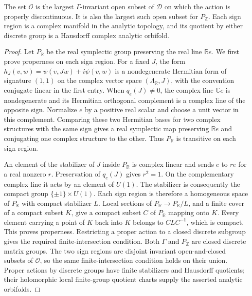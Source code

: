 \begin{theorem}\label{fam:src:F.2.2}\label{fam:st:F.2.2}
The set $\mathcal O$ is the largest $\Gamma$-invariant open subset of
$\mathcal D$ on which the action is properly discontinuous.  It is also
the largest such open subset for $P_{\mathbb Z}$.  Each sign region is
a complex manifold in the analytic topology, and its quotient by either
discrete group is a Hausdorff complex analytic orbifold.
\end{theorem}

\begin{proof}
Let $P_{\mathbb R}$ be the real symplectic group preserving the real line
$\mathbb Re$.  We first prove properness on each sign region.  For a fixed
$J$, the form
$h_J(v,w)=\psi(v,Jw)+i\psi(v,w)$ is a nondegenerate Hermitian form of
signature $(1,1)$ on the complex vector space $(\Lambda_{\mathbb R},J)$,
with the convention conjugate linear in the first entry.  When
$q_e(J)\ne0$, the complex line $\mathbb Ce$ is nondegenerate and its
Hermitian orthogonal complement is a complex line of the opposite sign.
Normalize $e$ by a positive real scalar and choose a unit vector in this
complement.  Comparing these two Hermitian bases for two complex
structures with the same sign gives a real symplectic map preserving
$\mathbb Re$ and conjugating one complex structure to the other.  Thus
$P_{\mathbb R}$ is transitive on each sign region.

An element of the stabilizer of $J$ inside $P_{\mathbb R}$ is complex
linear and sends $e$ to $r e$ for a real nonzero $r$.  Preservation of
$q_e(J)$ gives $r^2=1$.  On the complementary complex line it acts by an
element of $U(1)$.  The stabilizer is consequently the compact group
$\{\pm1\}\times U(1)$.  Each sign region is therefore a homogeneous
space of $P_{\mathbb R}$ with compact stabilizer $L$.  Local sections of
$P_{\mathbb R}\to P_{\mathbb R}/L$, and a finite cover of a compact
subset $K$, give a compact subset $C$ of $P_{\mathbb R}$ mapping onto
$K$.  Every element carrying a point of $K$ back into $K$ belongs to
$CLC^{-1}$, which is compact.  This proves properness.  Restricting a
proper action to a closed discrete subgroup gives
the required finite-intersection condition.  Both $\Gamma$ and
$P_{\mathbb Z}$ are closed discrete matrix groups.  The two sign regions
are disjoint invariant open-and-closed subsets of $\mathcal O$, so the
same finite-intersection condition holds on their union.  Proper actions
by discrete groups have finite stabilizers and Hausdorff quotients; their
holomorphic local finite-group quotient charts supply the asserted
analytic orbifolds.


\end{proof}
